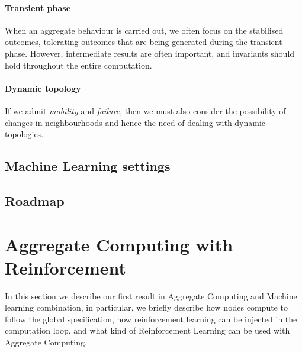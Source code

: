 \documentclass[
  twocolumn,
]{ceurart}
\begin{document}
\paragraph{Transient phase}
%
When an aggregate behaviour is carried out,
 we often focus on the stabilised outcomes,
 tolerating outcomes that are being generated
 during the transient phase.
%
However, intermediate results are often important,
 and invariants should hold throughout the entire computation.

\paragraph{Dynamic topology}
%
If we admit \emph{mobility} and \emph{failure},
 then we must also consider 
 the possibility of changes in neighbourhoods
 and hence the need of dealing with dynamic topologies.

\subsection{Machine Learning settings}
\subsection{Roadmap}

\section{Aggregate Computing with Reinforcement}
In this section we describe our first result in Aggregate Computing and Machine learning combination,
 in particular, we briefly describe how nodes compute to follow the global specification,
 how reinforcement learning can be injected in the computation loop,
 and what kind of Reinforcement Learning can be used with Aggregate Computing.
\end{document}
